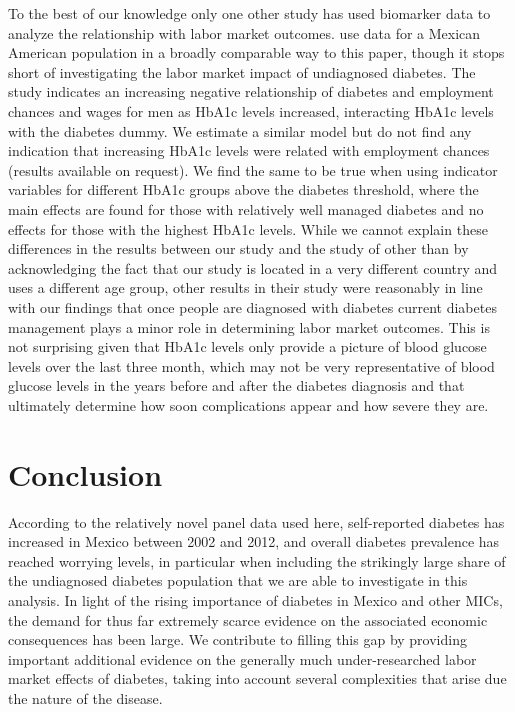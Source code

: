 \documentclass[12pt,english,british]{article}
\begin{document}
To the best of our knowledge only one other study has used biomarker data to analyze the relationship with labor market outcomes. \citet{BrownIII2011} use data for a Mexican American
population in a broadly comparable way to this paper, though it stops short of investigating
the labor market impact of undiagnosed diabetes. The study indicates
an increasing negative relationship of diabetes and employment
chances and wages for men as \ac{HbA1c} levels increased, interacting \ac{HbA1c} levels
with the diabetes dummy. We estimate a similar model but
do not find any indication that increasing \ac{HbA1c} levels were
related with employment chances (results available on request). We
find the same to be true when using indicator variables for different
\ac{HbA1c} groups above the diabetes threshold, where the main effects
are found for those with relatively well managed diabetes and no
effects for those with the highest \ac{HbA1c} levels. While we cannot explain these differences in the results between our study and the study of \citet{BrownIII2011} other than by acknowledging the fact that our study is located in a very different country and uses a different age group, other results in their study were reasonably in line with our findings that once people are diagnosed with diabetes current diabetes management plays a minor role in determining labor market outcomes. This is not surprising given that \ac{HbA1c} levels only provide a picture of blood glucose levels over the last three month, which may not be very representative of blood glucose levels in the years before and after the diabetes diagnosis and that ultimately determine how soon complications appear and how severe they are.



\section{\label{sec:Conclusion}Conclusion}

According to the relatively novel panel data used here, self-reported diabetes has increased in Mexico between 2002 and 2012, and overall
diabetes prevalence has reached worrying
levels, in particular when including the strikingly large share of the undiagnosed diabetes population that we are able to investigate in this analysis. In light of the rising importance of diabetes in Mexico and other \ac{MICs}, the demand for  thus far extremely scarce evidence on the associated economic consequences has been large. We contribute to filling this gap by providing important additional evidence on the generally much under-researched labor market effects of diabetes, taking into account several complexities that arise due the nature of the disease.
\end{document}

